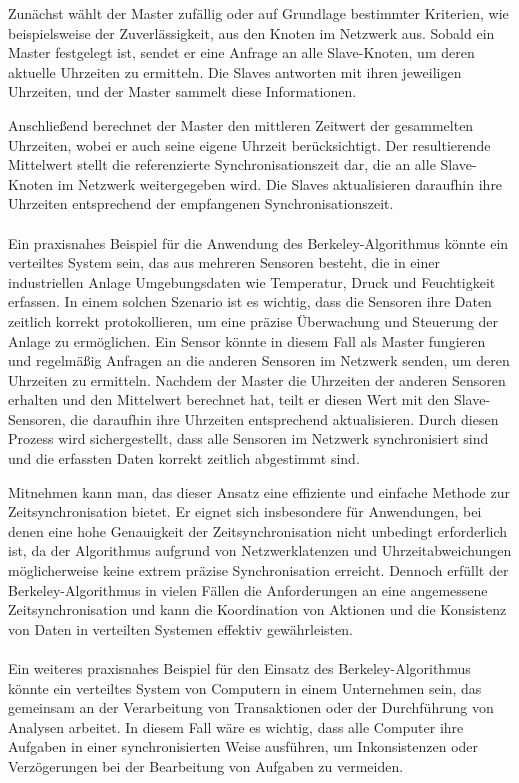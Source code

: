\documentclass[../vs-script-first-v01.tex]{subfiles}
\begin{document}
Zunächst wählt der Master zufällig oder auf Grundlage bestimmter Kriterien, wie beispielsweise der Zuverlässigkeit, aus den Knoten im Netzwerk aus. Sobald ein Master festgelegt ist, sendet er eine Anfrage an alle Slave-Knoten, um deren aktuelle Uhrzeiten zu ermitteln. Die Slaves antworten mit ihren jeweiligen Uhrzeiten, und der Master sammelt diese Informationen.

Anschließend berechnet der Master den mittleren Zeitwert der gesammelten Uhrzeiten, wobei er auch seine eigene Uhrzeit berücksichtigt. Der resultierende Mittelwert stellt die referenzierte Synchronisationszeit dar, die an alle Slave-Knoten im Netzwerk weitergegeben wird. Die Slaves aktualisieren daraufhin ihre Uhrzeiten entsprechend der empfangenen Synchronisationszeit.
\\\\
Ein praxisnahes Beispiel für die Anwendung des Berkeley-Algorithmus könnte ein verteiltes System sein, das aus mehreren Sensoren besteht, die in einer industriellen Anlage Umgebungsdaten wie Temperatur, Druck und Feuchtigkeit erfassen. In einem solchen Szenario ist es wichtig, dass die Sensoren ihre Daten zeitlich korrekt protokollieren, um eine präzise Überwachung und Steuerung der Anlage zu ermöglichen.
Ein Sensor könnte in diesem Fall als Master fungieren und regelmäßig Anfragen an die anderen Sensoren im Netzwerk senden, um deren Uhrzeiten zu ermitteln. Nachdem der Master die Uhrzeiten der anderen Sensoren erhalten und den Mittelwert berechnet hat, teilt er diesen Wert mit den Slave-Sensoren, die daraufhin ihre Uhrzeiten entsprechend aktualisieren. Durch diesen Prozess wird sichergestellt, dass alle Sensoren im Netzwerk synchronisiert sind und die erfassten Daten korrekt zeitlich abgestimmt sind.

Mitnehmen kann man, das dieser Ansatz eine effiziente und einfache Methode zur Zeitsynchronisation bietet. Er eignet sich insbesondere für Anwendungen, bei denen eine hohe Genauigkeit der Zeitsynchronisation nicht unbedingt erforderlich ist, da der Algorithmus aufgrund von Netzwerklatenzen und Uhrzeitabweichungen möglicherweise keine extrem präzise Synchronisation erreicht. Dennoch erfüllt der Berkeley-Algorithmus in vielen Fällen die Anforderungen an eine angemessene Zeitsynchronisation und kann die Koordination von Aktionen und die Konsistenz von Daten in verteilten Systemen effektiv gewährleisten.
\\\\
Ein weiteres praxisnahes Beispiel für den Einsatz des Berkeley-Algorithmus könnte ein verteiltes System von Computern in einem Unternehmen sein, das gemeinsam an der Verarbeitung von Transaktionen oder der Durchführung von Analysen arbeitet. In diesem Fall wäre es wichtig, dass alle Computer ihre Aufgaben in einer synchronisierten Weise ausführen, um Inkonsistenzen oder Verzögerungen bei der Bearbeitung von Aufgaben zu vermeiden.
\end{document}
